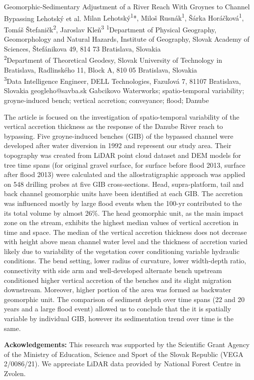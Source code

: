 \abstract
{Geomorphic-Sedimentary Adjustment of a River Reach With Groynes to Channel Bypassing} %
{Lehotský et al.} %
{Milan Lehotský\textsuperscript{1}*, Miloš Rusnák\textsuperscript{1}, Šárka Horáčková\textsuperscript{1}, 
	Tomáš Štefaničk\textsuperscript{2}, Jaroslav Kleň\textsuperscript{3}} %
{\KLtag} %
{\textsuperscript{1}Department of Physical Geography, Geomorphology and Natural Hazards, Institute of Geography, Slovak Academy of Sciences, Štefánikova 49, 814 73 Bratislava, Slovakia\\
\textsuperscript{2}Department of Theoretical Geodesy, Slovak University of Technology in Bratislava, Radlinského 11, Block A, 810 05 Bratislava, Slovakia\\
\textsuperscript{3}Data Intelligence Engineer, DELL Technologies, Fazuľová 7, 81107 Bratislava, Slovakia 
} %
{geogleho@savba.sk}  %
{Gabcikovo Waterworks; spatio-temporal variability; groyne-induced bench; vertical accretion; conveyance; flood; Danube }%
{The article is focused on the investigation of spatio-temporal variability of the vertical accretion thickness as the response of the Danube River reach to bypassing. Five groyne-induced benches (GIB) of the bypassed channel were developed after water diversion in 1992 and represent our study area. Their topography was created from LiDAR point cloud dataset and DEM models for tree time spans (for original gravel surface, for surface before flood 2013, surface after flood 2013) were calculated and the allostratigraphic approach was applied on 548 drilling probes at five GIB cross-sections.  Head, supra-platform, tail and back channel geomorphic units have been identified at each GIB. The accretion was influenced mostly by large flood events when the 100-yr contributed to the its total volume by almost 26\%. The head geomorphic unit, as the main impact zone on the stream, exhibits the highest median values of vertical accretion in time and space. The median of the vertical accretion thickness does not decrease with height above mean channel water level and the thickness of accretion varied likely due to variability of the vegetation cover conditioning variable hydraulic conditions. The bend setting, lower radius of curvature, lower width-depth ratio, connectivity with side arm and well-developed alternate bench upstream conditioned higher vertical accretion of the benches and its slight migration downstream. Moreover, higher portion of the area was formed as backwater geomorphic unit. The comparison of sediment depth over time spans (22 and 20 years and a large flood event) allowed us to conclude that the it is spatially variable by individual GIB, however its sedimentation trend over time is the same.
	
	\noindent	
	\textbf{Ackowledgements:} This research was supported by the Scientific Grant Agency of the Ministry of Education, Science and Sport of the Slovak Republic (VEGA 2/0086/21). We appreciate LiDAR data provided by National Forest Centre in Zvolen.
}%
